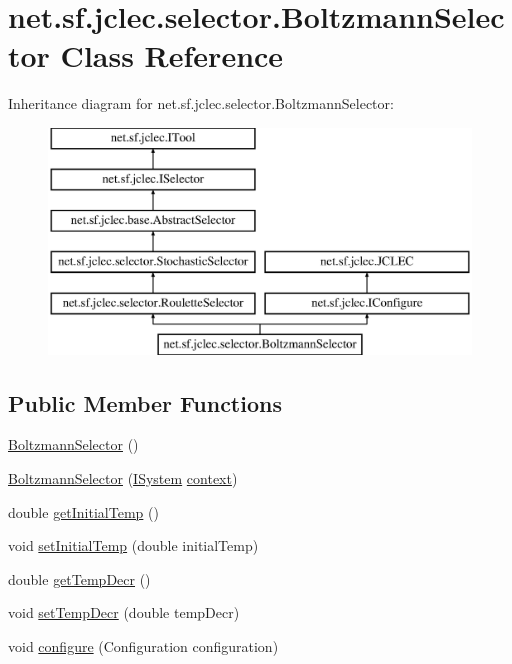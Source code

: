 \hypertarget{classnet_1_1sf_1_1jclec_1_1selector_1_1_boltzmann_selector}{\section{net.\-sf.\-jclec.\-selector.\-Boltzmann\-Selector Class Reference}
\label{classnet_1_1sf_1_1jclec_1_1selector_1_1_boltzmann_selector}
}
Inheritance diagram for net.\-sf.\-jclec.\-selector.\-Boltzmann\-Selector\-:\begin{figure}[H]
\begin{center}
\leavevmode
\includegraphics[height=6.000000cm]{classnet_1_1sf_1_1jclec_1_1selector_1_1_boltzmann_selector}
\end{center}
\end{figure}
\subsection*{Public Member Functions}
\begin{DoxyCompactItemize}
\item 
\hyperlink{classnet_1_1sf_1_1jclec_1_1selector_1_1_boltzmann_selector_a7ffc12fb7136454bab5790095287fd04}{Boltzmann\-Selector} ()
\item 
\hyperlink{classnet_1_1sf_1_1jclec_1_1selector_1_1_boltzmann_selector_a83bd891e99311359aa59172c90292920}{Boltzmann\-Selector} (\hyperlink{interfacenet_1_1sf_1_1jclec_1_1_i_system}{I\-System} \hyperlink{classnet_1_1sf_1_1jclec_1_1base_1_1_abstract_selector_a4304fe5c27aa7631dc91678d22473b94}{context})
\item 
double \hyperlink{classnet_1_1sf_1_1jclec_1_1selector_1_1_boltzmann_selector_a35d0f9ab6048f4be319efdfd26123c35}{get\-Initial\-Temp} ()
\item 
void \hyperlink{classnet_1_1sf_1_1jclec_1_1selector_1_1_boltzmann_selector_ac9fe1ead0fc07c2254163f283612213d}{set\-Initial\-Temp} (double initial\-Temp)
\item 
double \hyperlink{classnet_1_1sf_1_1jclec_1_1selector_1_1_boltzmann_selector_a5a30dfeedd870ac2b60c9aef5d44c277}{get\-Temp\-Decr} ()
\item 
void \hyperlink{classnet_1_1sf_1_1jclec_1_1selector_1_1_boltzmann_selector_a8e33ec0f1d3ff60baf42f4ae9d3994a9}{set\-Temp\-Decr} (double temp\-Decr)
\item 
void \hyperlink{classnet_1_1sf_1_1jclec_1_1selector_1_1_boltzmann_selector_a65e48d1e3e59775fffa2e2533f18537c}{configure} (Configuration configuration)
\end{DoxyCompactItemize}
